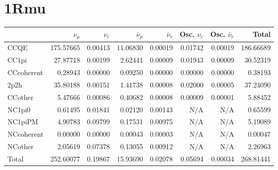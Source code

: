 \documentclass[10pt,a4paper]{article}
\begin{document}
\section*{1Rmu}
\begin{tabular} { | l ||r | r | r | r | r | r | | r | }
\hline
              & $\nu_\mu$            & $\nu_e$              & $\bar{\nu}_{\mu}$    & $\bar{\nu}_{e}$      & Osc. $\nu_e$         & Osc. $\bar{\nu}_{e}$ & Total                \\ \hline\hline
 CCQE         & 175.57665            & 0.00413              & 11.06830             & 0.00019              & 0.01742              & 0.00019              & 186.66689            \\ \hline
 CC1pi        & 27.87718             & 0.00199              & 2.62441              & 0.00009              & 0.01943              & 0.00009              & 30.52319             \\ \hline
 CCcoherent   & 0.28943              & 0.00000              & 0.09250              & 0.00000              & 0.00000              & 0.00000              & 0.38193              \\ \hline
 2p2h         & 35.80188             & 0.00151              & 1.41738              & 0.00008              & 0.02000              & 0.00005              & 37.24090             \\ \hline
 CCother      & 5.47666              & 0.00086              & 0.40682              & 0.00008              & 0.00009              & 0.00001              & 5.88452              \\ \hline
 NC1pi0       & 0.61495              & 0.01841              & 0.02120              & 0.00143              & N/A                  & N/A                  & 0.65599              \\ \hline
 NC1piPM      & 4.90783              & 0.09799              & 0.17531              & 0.00975              & N/A                  & N/A                  & 5.19089              \\ \hline
 NCcoherent   & 0.00000              & 0.00000              & 0.00043              & 0.00003              & N/A                  & N/A                  & 0.00047              \\ \hline
 NCother      & 2.05619              & 0.07378              & 0.13055              & 0.00912              & N/A                  & N/A                  & 2.26963              \\ \hline
\hline
 Total        & 252.60077            & 0.19867              & 15.93690             & 0.02078              & 0.05694              & 0.00034              & 268.81441            \\ \hline

\end{tabular}
\end{document}
